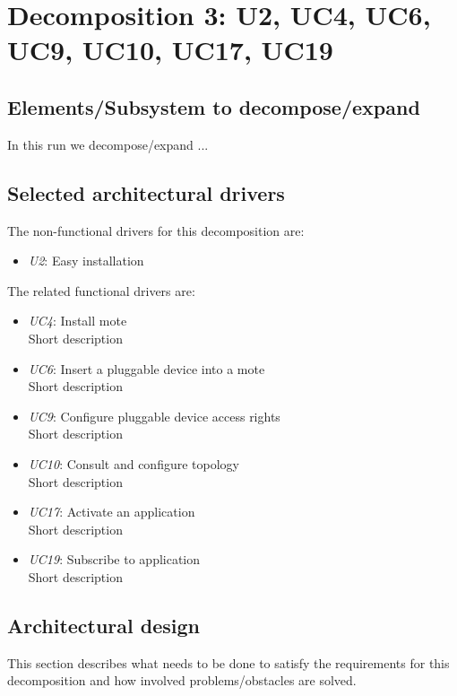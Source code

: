 \section{Decomposition 3: U2, UC4, UC6, UC9, UC10, UC17, UC19}

\subsection{Elements/Subsystem to decompose/expand}
    In this run we decompose/expand ...


\subsection{Selected architectural drivers}
    The non-functional drivers for this decomposition are:
    \begin{itemize}
    	\item \emph{U2}: Easy installation
    \end{itemize}

    The related functional drivers are:
    \begin{itemize}
        \item \emph{UC4}: Install mote \\
              Short description
        \item \emph{UC6}: Insert a pluggable device into a mote \\
              Short description
        \item \emph{UC9}: Configure pluggable device access rights \\
              Short description
        \item \emph{UC10}: Consult and configure topology \\
              Short description
        \item \emph{UC17}: Activate an application \\
              Short description
        \item \emph{UC19}: Subscribe to application \\
              Short description
    \end{itemize}


\subsection{Architectural design}
    This section describes what needs to be done to satisfy the requirements for
    this decomposition and how involved problems/obstacles are solved.


